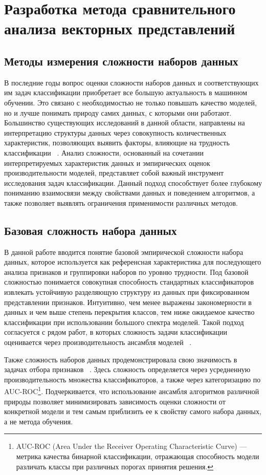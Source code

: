 \documentclass[specification,annotation,times]{itmo-student-thesis}
\begin{document}
\chapter{Разработка метода сравнительного анализа векторных представлений}

\section{Методы измерения сложности наборов данных}

В последние годы вопрос оценки сложности наборов данных и соответствующих им задач классификации приобретает все большую актуальность в машинном обучении. Это связано с необходимостью не только повышать качество моделей, но и лучше понимать природу самих данных, с которыми они работают. Большинство существующих исследований в данной области, направлены на интерпретацию структуры данных через совокупность количественных характеристик, позволяющих выявить факторы, влияющие на трудность классификации ~\cite{990132, 10.1145/3347711}. Анализ сложности, основанный на сочетании интерпретируемых характеристик данных и эмпирических оценок производительности моделей, представляет собой важный инструмент исследования задач классификации. Данный подход способствует более глубокому пониманию взаимосвязи между свойствами данных и поведением алгоритмов, а также позволяет выявлять ограничения применимости различных методов.


\section{Базовая сложность набора данных}

В данной работе вводится понятие базовой эмпирической сложности набора данных, которое используется как референсная характеристика для последующего анализа признаков и группировки наборов по уровню трудности. Под базовой сложностью понимается совокупная способность стандартных классификаторов извлекать устойчивую разделяющую структуру из данных при фиксированном представлении признаков. Интуитивно, чем менее выражены закономерности в данных и чем выше степень перекрытия классов, тем ниже ожидаемое качество классификации при использовании большого спектра моделей. Такой подход согласуется с рядом работ, в которых сложность задачи классификации оценивается через производительность ансамбля моделей ~\cite{collins2018evolutionary}.

Также сложность наборов данных продемонстрировала свою значимость в задачах отбора признаков ~\cite{elmakias2025choosing}. Здесь сложность определяется через усредненную производительность множества классификаторов, а также через категоризацию по AUC-ROC\footnote{AUC-ROC (Area Under the Receiver Operating Characteristic Curve) — метрика качества бинарной классификации, отражающая способность модели различать классы при различных порогах принятия решения.}. Подчеркивается, что использование ансамбля алгоритмов различной природы позволяет минимизировать зависимость оценки сложности от конкретной модели и тем самым приблизить ее к свойству самого набора данных, а не метода обучения.
\end{document}
